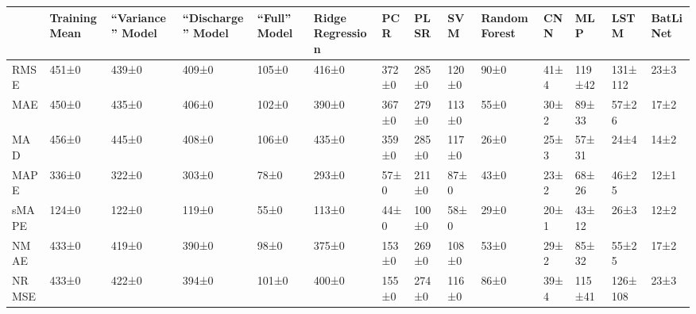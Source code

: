 \begin{tabular}{llllllllllllll}
\toprule
 & Training Mean & ``Variance'' Model & ``Discharge'' Model & ``Full'' Model & Ridge Regression & PCR & PLSR & SVM & Random Forest & CNN & MLP & LSTM & BatLiNet \\
\midrule
RMSE & 451±0 & 439±0 & 409±0 & 105±0 & 416±0 & 372±0 & 285±0 & 120±0 & 90±0 & 41±4 & 119±42 & 131±112 & 23±3 \\
MAE & 450±0 & 435±0 & 406±0 & 102±0 & 390±0 & 367±0 & 279±0 & 113±0 & 55±0 & 30±2 & 89±33 & 57±26 & 17±2 \\
MAD & 456±0 & 445±0 & 408±0 & 106±0 & 435±0 & 359±0 & 285±0 & 117±0 & 26±0 & 25±3 & 57±31 & 24±4 & 14±2 \\
MAPE & 336±0 & 322±0 & 303±0 & 78±0 & 293±0 & 57±0 & 211±0 & 87±0 & 43±0 & 23±2 & 68±26 & 46±25 & 12±1 \\
sMAPE & 124±0 & 122±0 & 119±0 & 55±0 & 113±0 & 44±0 & 100±0 & 58±0 & 29±0 & 20±1 & 43±12 & 26±3 & 12±2 \\
NMAE & 433±0 & 419±0 & 390±0 & 98±0 & 375±0 & 153±0 & 269±0 & 108±0 & 53±0 & 29±2 & 85±32 & 55±25 & 17±2 \\
NRMSE & 433±0 & 422±0 & 394±0 & 101±0 & 400±0 & 155±0 & 274±0 & 116±0 & 86±0 & 39±4 & 115±41 & 126±108 & 23±3 \\
\bottomrule
\end{tabular}
